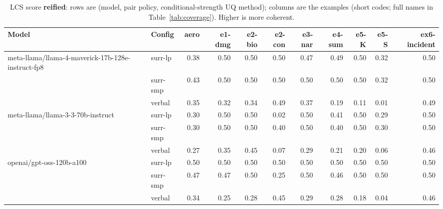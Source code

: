 \documentclass[11pt]{article}
\begin{document}
\begin{table}[htbp]
\centering
\footnotesize
\setlength{\tabcolsep}{3.5pt}
\caption{LCS score \textbf{reified}: rows are (model, pair policy, conditional-strength UQ method); columns are the examples (short codes; full names in Table~\ref{tab:coverage}). Higher is more coherent.}
\label{tab:reified}
\begin{tabular}{llrrrrrrrrr}
\toprule
\textbf{Model} & \textbf{Config} & \textbf{aero} & \textbf{e1-dmg} & \textbf{e2-bio} & \textbf{e2-con} & \textbf{e3-nar} & \textbf{e4-sum} & \textbf{e5-K} & \textbf{e5-S} & \textbf{ex6-incident} \\
\midrule
meta-llama/llama-4-maverick-17b-128e-instruct-fp8 & surr-lp & 0.38 & 0.50 & 0.50 & 0.50 & 0.47 & 0.49 & 0.50 & 0.32 & 0.50 \\
 & surr-smp & 0.43 & 0.50 & 0.50 & 0.50 & 0.50 & 0.50 & 0.50 & 0.32 & 0.50 \\
 & verbal & 0.35 & 0.32 & 0.34 & 0.49 & 0.37 & 0.19 & 0.11 & 0.01 & 0.49 \\
\midrule
meta-llama/llama-3-3-70b-instruct & surr-lp & 0.30 & 0.50 & 0.50 & 0.02 & 0.50 & 0.41 & 0.50 & 0.29 & 0.50 \\
 & surr-smp & 0.30 & 0.50 & 0.50 & 0.40 & 0.50 & 0.40 & 0.50 & 0.30 & 0.50 \\
 & verbal & 0.27 & 0.35 & 0.45 & 0.07 & 0.29 & 0.21 & 0.20 & 0.06 & 0.46 \\
\midrule
openai/gpt-oss-120b-a100 & surr-lp & 0.50 & 0.50 & 0.50 & 0.50 & 0.50 & 0.50 & 0.50 & 0.50 & 0.50 \\
 & surr-smp & 0.47 & 0.47 & 0.50 & 0.25 & 0.50 & 0.46 & 0.50 & 0.50 & 0.50 \\
 & verbal & 0.34 & 0.25 & 0.28 & 0.45 & 0.29 & 0.28 & 0.18 & 0.04 & 0.46 \\
\bottomrule
\end{tabular}
\end{table}
\end{document}
